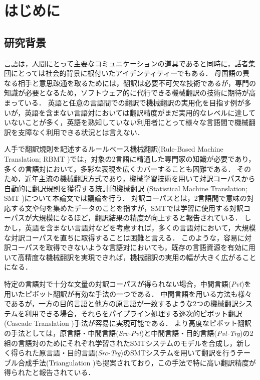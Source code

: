 \documentclass[japanese]{jnlp_1.4}
\begin{document}
\maketitle


\section{はじめに}
\label{sec:intro}


\subsection{研究背景}
\label{sec:background}

言語は，人間にとって主要なコミュニケーションの道具であると同時に，話者集団にとっては社会的背景に根付いたアイデンティティーでもある．
母国語の異なる相手と意思疎通を取るためには，翻訳は必要不可欠な技術であるが，専門の知識が必要となるため，ソフトウェア的に代行できる機械翻訳の技術に期待が高まっている．
英語と任意の言語間での翻訳で機械翻訳の実用化を目指す例が多いが，英語を含まない言語対においては翻訳精度がまだ実用的なレベルに達していないことが多く，英語を熟知していない利用者にとって様々な言語間で機械翻訳を支障なく利用できる状況とは言えない．

人手で翻訳規則を記述するルールベース機械翻訳(Rule-Based Machine Translation; RBMT \cite{nirenburg89})では，対象の2言語に精通した専門家の知識が必要であり，多くの言語対において，多彩な表現を広くカバーすることも困難である．
そのため，近年主流の機械翻訳方式であり，機械学習技術を用いて対訳コーパスから自動的に翻訳規則を獲得する統計的機械翻訳 (Statistical Machine Translation; SMT \cite{brown93})について本論文では議論を行う．
対訳コーパスとは，2言語間で意味の対応する文や句を集めたデータのことを指すが，SMTでは学習に使用する対訳コーパスが大規模になるほど，翻訳結果の精度が向上すると報告されている\cite{dyer08}．
しかし，英語を含まない言語対などを考慮すれば，多くの言語対において，大規模な対訳コーパスを直ちに取得することは困難と言える．
このような，容易に対訳コーパスを取得できないような言語対においても，既存の言語資源を有効に用いて高精度な機械翻訳を実現できれば，機械翻訳の実用の幅が大きく広がることになる．

特定の言語対で十分な文量の対訳コーパスが得られない場合，中間言語(\textit{Pvt})を用いたピボット翻訳が有効な手法の一つである\cite{gispert06,cohn07,zhu14}．
中間言語を用いる方法も様々であるが，一方の目的言語と他方の原言語が一致するような2つの機械翻訳システムを利用できる場合，それらをパイプライン処理する逐次的ピボット翻訳(Cascade Translation \cite{gispert06})手法が容易に実現可能である．
より高度なピボット翻訳の手法としては，原言語・中間言語(\textit{Src-Pvt})と中間言語・目的言語(\textit{Pvt-Trg})の2組の言語対のためにそれぞれ学習されたSMTシステムのモデルを合成し，新しく得られた原言語・目的言語(\textit{Src-Trg})のSMTシステムを用いて翻訳を行うテーブル合成手法(Triangulation \cite{cohn07})も提案されており，この手法で特に高い翻訳精度が得られたと報告されている\cite{utiyama07}．
\end{document}
